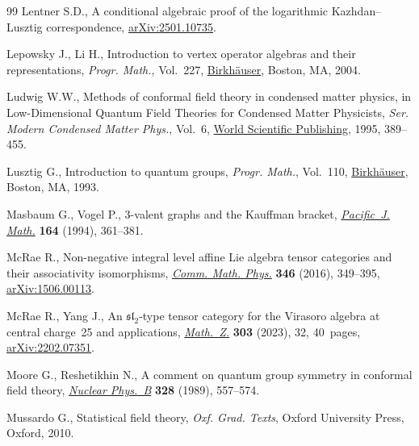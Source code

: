 \documentclass[pdftex]{sigma}
\numberwithin{equation}{section}
\begin{document}
\begin{thebibliography}{99}
Lentner S.D., A conditional algebraic proof of the logarithmic
 {K}azhdan--{L}usztig correspondence,
 \href{http://arxiv.org/abs/2501.10735}{arXiv:2501.10735}.

Lepowsky J., Li H., Introduction to vertex operator algebras and their
 representations, \textit{Progr. Math.}, Vol.~227,
 \href{https://doi.org/10.1007/978-0-8176-8186-9}{Birkh\"auser}, Boston, MA,
 2004.

Ludwig W.W., Methods of conformal field theory in condensed matter physics, in
 Low-{D}imensional {Q}uantum {F}ield {T}heories for {C}ondensed {M}atter
 {P}hysicists, \textit{Ser. Modern Condensed Matter Phys.}, Vol.~6,
 \href{https://doi.org/10.1142/9789814447027_0007}{World Scientific
 Publishing}, 1995, 389--455.

Lusztig G., Introduction to quantum groups, \textit{Progr. Math.}, Vol.~110,
 \href{https://doi.org/10.1007/978-3-031-23817-8}{Birkh\"auser}, Boston, MA,
 1993.

Masbaum G., Vogel P., {$3$}-valent graphs and the {K}auffman bracket,
 \href{https://doi.org/10.2140/pjm.1994.164.361}{\textit{Pacific~J. Math.}}
 \textbf{164} (1994), 361--381.

McRae R., Non-negative integral level affine {L}ie algebra tensor categories
 and their associativity isomorphisms,
 \href{https://doi.org/10.1007/s00220-016-2683-y}{\textit{Comm. Math. Phys.}}
 \textbf{346} (2016), 349--395,
 \href{http://arxiv.org/abs/1506.00113}{arXiv:1506.00113}.

McRae R., Yang J., An {$\mathfrak{sl}_2$}-type tensor category for the
 {V}irasoro algebra at central charge~25 and applications,
 \href{https://doi.org/10.1007/s00209-022-03197-z}{\textit{Math.~Z.}}
 \textbf{303} (2023), 32, 40~pages,
 \href{http://arxiv.org/abs/2202.07351}{arXiv:2202.07351}.

Moore G., Reshetikhin N., A comment on quantum group symmetry in conformal
 field theory,
 \href{https://doi.org/10.1016/0550-3213(89)90219-8}{\textit{Nuclear Phys.~B}}
 \textbf{328} (1989), 557--574.

Mussardo G., Statistical field theory, \textit{Oxf. Grad. Texts}, Oxford University
 Press, Oxford, 2010.


\end{thebibliography}
\end{document}
